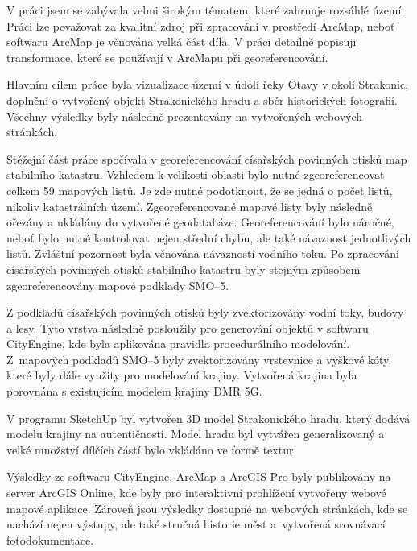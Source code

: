 \documentclass[thesis=M,czech]{FITthesis}[2012/06/26]
\begin{document}
V práci jsem se zabývala velmi širokým tématem, které zahrnuje rozsáhlé území. Práci lze považovat za kvalitní zdroj při zpracování v prostředí ArcMap, neboť softwaru ArcMap je věnována velká část díla. V práci detailně popisuji transformace, které se používají v ArcMapu při georeferencování.





\begin{conclusion}
Hlavním cílem práce byla vizualizace území v údolí řeky Otavy v okolí Strakonic, doplnění o vytvořený objekt Strakonického hradu a sběr historických fotografií. Všechny výsledky byly následně prezentovány na vytvořených webových stránkách.

Stěžejní část práce spočívala v georeferencování císařských povinných otisků map stabilního katastru. Vzhledem k velikosti oblasti bylo nutné zgeoreferencovat celkem 59 mapových listů. Je zde nutné podotknout, že se jedná o počet listů, nikoliv katastrálních území. Zgeoreferencované mapové listy byly následně ořezány a ukládány do vytvořené geodatabáze. Georeferencování bylo náročné, neboť bylo nutné kontrolovat nejen střední chybu, ale také návaznost jednotlivých listů. Zvláštní pozornost byla věnována návaznosti vodního toku. Po zpracování císařských povinných otisků stabilního katastru byly stejným způsobem zgeoreferencovány mapové podklady SMO–5. 

Z podkladů císařských povinných otisků byly zvektorizovány vodní toky, budovy a lesy. Tyto vrstva následně posloužily pro generování objektů v softwaru CityEngine, kde byla aplikována pravidla procedurálního modelování. Z~mapových podkladů SMO–5 byly zvektorizovány vrstevnice a výškové kóty, které byly dále využity pro modelování krajiny. Vytvořená krajina byla porovnána s existujícím modelem krajiny DMR 5G. 

V programu SketchUp byl vytvořen 3D model Strakonického hradu, který dodává modelu krajiny na autentičnosti. Model hradu byl vytvářen generalizovaný a velké množství dílčích částí bylo vkládáno ve formě textur. 

Výsledky ze softwaru CityEngine, ArcMap a ArcGIS Pro byly publikovány na server ArcGIS Online, kde byly pro interaktivní prohlížení vytvořeny webové mapové aplikace. Zároveň jsou výsledky dostupné na webových stránkách, kde se nachází nejen výstupy, ale také stručná historie měst a~vytvořená srovnávací fotodokumentace.





\end{conclusion}
\end{document}

